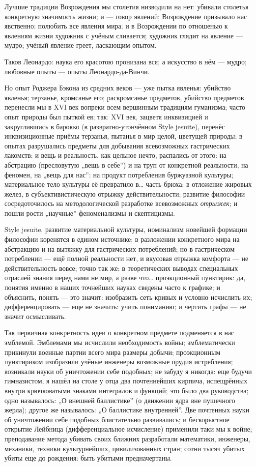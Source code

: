 \documentclass[12pt,a4paper,oneside]{book}
\begin{document}
Лучшие традиции Возрождения мы столетия низводили на нет: убивали столетья конкретную значимость жизни; и — говор явлений; Возрождение призывало нас явственно: полюбить все явления мира; и в Возрождении по отношенью к явлениям жизни художник с учёным сливается; художник глядит на явление — мудро; учёный явление греет, ласкающим опытом.

Таков Леонардо: наука его красотою пронизана вся; а искусство в нём — мудро; любовные опыты — опыты Леонардо-да-Винчи.

Но опыт Роджера Бэкона из средних веков — уже пытка явленья: убийство явленья; терзанье, кромсанье его; раскромсанье предметов, убийство предметов перенесли мы в XVI век вопреки всем вершинным традициям гуманизма; часто опыт природы был пыткой ея; так: XVI век, зацветя инквизицией и закруглившись в барокко (в развратно-утончённом Style jesuite), перенёс инквизиционные приёмы терзанья, пытанья в мир целой, цветущей природы; в опытах разрушались предметы для добывания всевозможных гастрических лакомств: и вещь и реальность, как цельное нечто, распались от этого: на абстрацию (пресловутую „вещь в себе”) и на труп от конкретной реальности, на феномен, на „вещь для нас”: на продукт потребления буржуазной культуры; материальное тело культуры её превратило в… часть брюха: в отложение жировых желез, в субъективистическую отрыжку действительности; развитие философии сосредоточилось на методологической разработке всевозможных \emph{отрыжек}; и пошли рости „научные” феноменализмы и скептицизмы.

Style jesuite, развитие материальной культуры, номинализм новейшей формации философии коренятся в едином источнике: в разложении конкретного мира на абстракцию и на вытяжку для гастрических потреблений; но в гастрическом потреблении — ещё полной реальности нет, и вкусовая отрыжка комфорта — не действительность вовсе; точно так же: в теоретических выводах специальных отраслей знания перед нами не мир, а разве что… проэкционный пунктирик: да, понятия именно в наших точнейших науках сведены часто к графике; и объяснить, понять — это значит: изобразить сеть кривых и условно исчислить их; дифференцировать — еще не значить: учить пониманию; и чертить графы — не значит осмысливать.

Так первичная конкретность идеи о конкретном предмете подменяется в нас эмблемой. Эмблемами мы исчислили необходимость войны; эмблематически прикинули военные партии всего мира размеры добычи; проэкционным пунктириком изобразили учёные инженеры возможные орудия истребления; возникали науки об уничтожении себе подобных; не забуду я никогда: еще будучи гимназистом, я нашёл на столе у отца два почтеннейших кирпича, испещрённых внутри крючковатыми знаками интегралов и функций; это было два руководства; одно называлось: „О внешней баллистике” (о движении ядра вне пушечного жерла); другое же называлось: „О баллистике внутренней”. Две почтенных науки об уничтожении себе подобных блистательно развивались; и бескорыстное открытие Лейбница (дифференциальное исчисление) применили таки мы к войне; преподавание метода убивать своих ближних разработали математики, инженеры, механики, техники культурнейших, цивилизованных стран; сотни тысяч убитых убиты еще до рождения: быть убитыми предначертаны.
\end{document}
